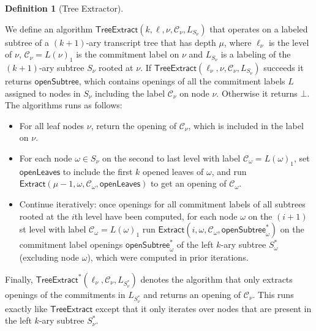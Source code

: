 \documentclass{article}
\theoremstyle{definition}
\newtheorem{definition}{Definition}
\begin{document}
\begin{definition}[Tree Extractor]\label{def:TreeExtract}

We define an algorithm $\textsf{TreeExtract}(k, \ell, \nu, \mathcal{C}_\nu, L_{S_\nu})$ that operates on a labeled subtree of a $(k+1)$-ary transcript tree that has depth $\mu$,  where $\ell_\nu$ is the level of $\nu$, $\mathcal{C}_\nu = L(\nu)_1$ is the commitment label on $\nu$ and $L_{S_\nu}$ is a labeling of the $(k+1)$-ary subtree $S_\nu$ rooted at $\nu$. If $\textsf{TreeExtract}(\ell_\nu, \nu, \mathcal{C}_\nu, L_{S_\nu})$ succeeds it returns $\textsf{openSubtree}$, which contains openings of all the commitment labels $L$ assigned to nodes in $S_\nu$ including the label $\mathcal{C}_\nu$ on node $\nu$. Otherwise it returns $\bot$. The algorithms runs as follows: 
\begin{itemize}  
\item For all leaf nodes $\nu$, return the opening of $\mathcal{C}_\nu$, which is included in the label on $\nu$. \
\item For each node $\omega \in S_{\nu}$ on the second to last level with label $\mathcal{C}_\omega = L(\omega)_1$, set $\textsf{openLeaves}$ to include the first $k$ opened leaves of $\omega$, and run $\textsf{Extract}(\mu - 1, \omega, \mathcal{C}_\omega, \textsf{openLeaves})$ to get an opening of $\mathcal{C}_\omega$.
\item Continue iteratively: once openings for all commitment labels of all subtrees rooted at the $i$th level have been computed, for each node $\omega$ on the $(i+1)$st level with label $\mathcal{C}_\omega = L(\omega)_1$ run $\textsf{Extract}(i, \omega, \mathcal{C}_\omega, \textsf{openSubtree}^*_\omega)$ on the commitment label openings $\textsf{openSubtree}^*_\omega$ of the left $k$-ary subtree $S^*_\omega$ (excluding node $\omega$), which were computed in prior iterations. 
\end{itemize}
Finally, $\textsf{TreeExtract}^*(\ell_\nu, \mathcal{C}_\nu, L_{S^*_\nu})$ denotes the algorithm that only extracts openings of the commitments in $L_{S^*_\nu}$ and returns an opening of $\mathcal{C}_\nu$. This runs exactly like $\textsf{TreeExtract}$ except that it only iterates over nodes that are present in the left $k$-ary subtree $S^*_\nu$. 
\end{definition}
\end{document}
